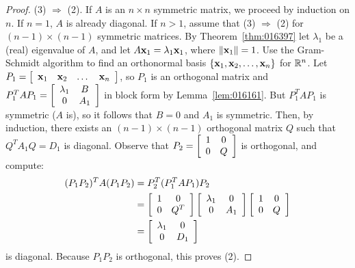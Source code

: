 \begin{proof}
(3) $\Rightarrow$ (2). If $A$ is an $n \times n$ symmetric matrix, we proceed by induction on $n$. If $n = 1$, $A$ is already diagonal. If $n > 1$, assume that (3) $\Rightarrow$ (2) for $(n - 1) \times (n - 1)$ symmetric matrices. By Theorem~\ref{thm:016397} let $\lambda_{1}$ be a (real) eigenvalue of $A$, and let $A\textbf{x}_{1} = \lambda_{1}\textbf{x}_{1}$, where $\|\textbf{x}_{1}\| = 1$. Use the Gram-Schmidt algorithm to find an orthonormal basis $\{\textbf{x}_{1}, \textbf{x}_{2}, \dots, \textbf{x}_{n}\}$ for $\mathbb{R}^n$. Let $P_{1} = \left[ \begin{array}{cccc} 
\textbf{x}_{1} & \textbf{x}_{2} & \dots & \textbf{x}_{n}
\end{array}\right]$, so $P_{1}$ is an orthogonal matrix and $P_{1}^TAP_{1} = \left[ \begin{array}{cc}
\lambda_{1} & B \\
0 & A_{1}
\end{array}\right]$
 in block form by Lemma~\ref{lem:016161}. But $P_{1}^TAP_{1}$ is symmetric ($A$ is), so it follows that $B = 0$ and $A_{1}$ is symmetric. Then, by induction, there exists an $(n - 1) \times (n - 1)$ orthogonal matrix $Q$ such that $Q^{T}A_{1}Q = D_{1}$ is diagonal. Observe that $P_{2} = \left[ \begin{array}{cc}
 1 & 0\\
 0 & Q
 \end{array}\right]$
 is orthogonal, and compute:
\begin{align*}
(P_{1}P_{2})^TA(P_{1}P_{2}) &= P_{2}^T(P_{1}^TAP_{1})P_{2} \\
&= \left[ \begin{array}{cc}
1 & 0 \\
0 & Q^T
\end{array}\right] \left[ \begin{array}{cc}
\lambda_{1} & 0 \\
0 & A_{1}
\end{array}\right]\left[ \begin{array}{cc}
1 & 0 \\
0 & Q
\end{array}\right]\\
&= \left[ \begin{array}{cc}
\lambda_{1} & 0 \\
0 & D_{1}
\end{array}\right]
\end{align*}
is diagonal. Because $P_{1}P_{2}$ is orthogonal, this proves (2).
\end{proof}

